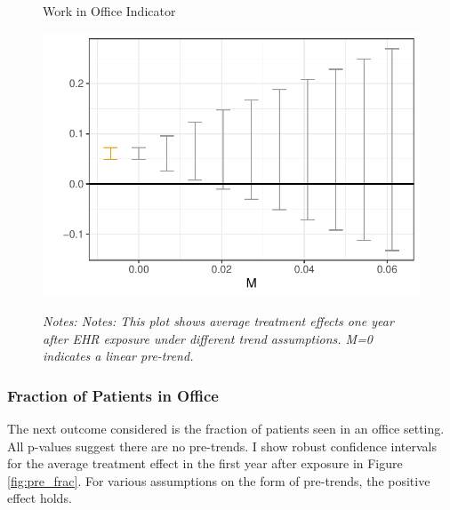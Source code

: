 \documentclass[12pt]{article}
\begin{document}
\begin{figure}[ht]
    \centering
    \captionsetup{width=.5\linewidth}
    \caption{Work in Office Indicator}
    \includegraphics[scale=.5]{Objects/office_ind_pretrends_plot.pdf}
    \label{fig:pre_work}
    \vspace{2mm}
    \caption*{\footnotesize{\textit{Notes: Notes: This plot shows average treatment effects one year after EHR exposure under different trend assumptions. M=0 indicates a linear pre-trend.}}}
\end{figure}

\subsubsection{Fraction of Patients in Office}

The next outcome considered is the fraction of patients seen in an office setting. All p-values suggest there are no pre-trends. I show robust confidence intervals for the average treatment effect in the first year after exposure in Figure \ref{fig:pre_frac}. For various assumptions on the form of pre-trends, the positive effect holds.
\end{document}

